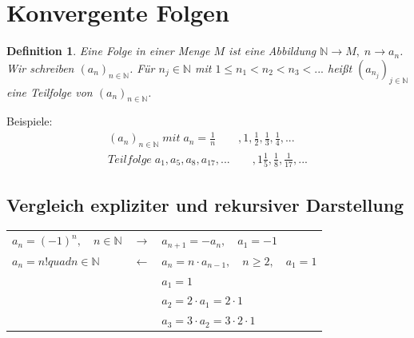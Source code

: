 \documentclass[12pt,a4paper]{article}%
\newtheorem{definition}[satz]{Definition}
\numberwithin{equation}{section}
\newcommand{\N}{\mathbb{N}}
\numberwithin{equation}{subsection}
\begin{document}
\section{Konvergente Folgen}
  \begin{definition}
    Eine Folge in einer Menge $M$ ist eine Abbildung $\N \rightarrow M,\; n\rightarrow a_n$. Wir schreiben $(a_n)_{n \in \N}$. Für $n_j \in \N$ mit $1\leq n_1 < n_2 < n_3 < ...$ heißt $(a_{n_j})_{j\in \N}$ eine Teilfolge von $(a_n)_{n \in \N}$.
  \end{definition}
  Beispiele:
  \begin{align*}
    (a_n)_{n \in \N}\; mit\; a_n = \frac{1}{n} \qquad , 1, \frac{1}{2}, \frac{1}{3}, \frac{1}{4},...\\
    Teilfolge\;a_1, a_5, a_8, a_{17},... \qquad  ,1 \frac{1}{5}, \frac{1}{8}, \frac{1}{17}, ...
  \end{align*}
  \subsection{Vergleich expliziter und rekursiver Darstellung}
  \begin{tabular}{l c l}
    $a_n = (-1)^n ,\quad n \in \N$ & $\rightarrow$ & $a_{n+1} = -a_n,\quad a_1 = -1$\\
    $a_n = n! quad n \in \N$ & $\leftarrow$ & $ a_n = n \cdot a_{n-1}, \quad n \geq 2, \quad a_1 = 1$\\
    $\;$ & $\;$ & $a_1 = 1$ \\
    $\;$ & $\;$ & $a_2 = 2\cdot a_1 = 2 \cdot 1$ \\
    $\;$ & $\;$ & $a_3 = 3\cdot a_2 = 3 \cdot 2 \cdot 1$ \\
  \end{tabular}    

  
\end{document}
